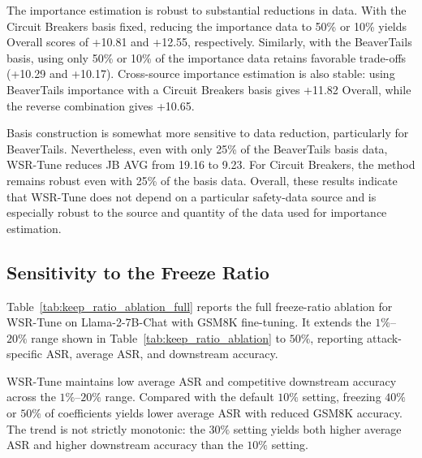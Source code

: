 \documentclass{article}
\begin{document}
The importance estimation is robust to substantial reductions in data. With the Circuit Breakers basis fixed, reducing the importance data to 50\% or 10\% yields Overall scores of +10.81 and +12.55, respectively. Similarly, with the BeaverTails basis, using only 50\% or 10\% of the importance data retains favorable trade-offs (+10.29 and +10.17). Cross-source importance estimation is also stable: using BeaverTails importance with a Circuit Breakers basis gives +11.82 Overall, while the reverse combination gives +10.65.

Basis construction is somewhat more sensitive to data reduction, particularly for BeaverTails. Nevertheless, even with only 25\% of the BeaverTails basis data, WSR-Tune reduces JB AVG from 19.16 to 9.23. For Circuit Breakers, the method remains robust even with 25\% of the basis data. Overall, these results indicate that WSR-Tune does not depend on a particular safety-data source and is especially robust to the source and quantity of the data used for importance estimation.




\subsection{Sensitivity to the Freeze Ratio}
\label{app:freeze_ratio}

Table~\ref{tab:keep_ratio_ablation_full} reports the full freeze-ratio ablation for WSR-Tune on Llama-2-7B-Chat with GSM8K fine-tuning. It extends the $1\%$--$20\%$ range shown in Table~\ref{tab:keep_ratio_ablation} to $50\%$, reporting attack-specific ASR, average ASR, and downstream accuracy.

WSR-Tune maintains low average ASR and competitive downstream accuracy across the $1\%$--$20\%$ range. Compared with the default $10\%$ setting, freezing $40\%$ or $50\%$ of coefficients yields lower average ASR with reduced GSM8K accuracy. The trend is not strictly monotonic: the $30\%$ setting yields both higher average ASR and higher downstream accuracy than the $10\%$ setting.
\end{document}
